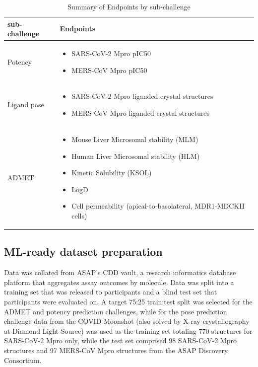 \documentclass[journal=jcim,manuscript=article]{achemso}
\begin{document}
\begin{table}[ht]
\centering
\caption{Summary of Endpoints by sub-challenge}
\begin{tabular}{|l|p{10cm}|}
\hline
\textbf{sub-challenge} & \textbf{Endpoints}  \\
\hline
Potency & 
\begin{itemize}
    \item SARS-CoV-2 Mpro pIC50
    \item MERS-CoV Mpro pIC50
\end{itemize} \\
\hline
Ligand pose  & 
\begin{itemize}
    \item SARS-CoV-2 Mpro liganded crystal structures
    \item MERS-CoV Mpro liganded crystal structures
\end{itemize} \\
\hline
ADMET & 
\begin{itemize}
  \item Mouse Liver Microsomal stability (MLM)
  \item Human Liver Microsomal stability (HLM)
  \item Kinetic Solubility (KSOL)
  \item LogD 
  \item Cell permeability (apical-to-basolateral, MDR1-MDCKII cells)
\end{itemize} \\
\hline
\end{tabular}
\end{table}

\subsection{ML-ready dataset preparation}

Data was collated from ASAP’s CDD vault, a research informatics database platform that aggregates assay outcomes by molecule. Data was split into a training set that was released to participants and a blind test set that participants were evaluated on. A target 75:25 train:test split was selected for the ADMET and potency prediction challenges, while for the pose prediction challenge data from the COVID Moonshot\cite{boby_2023} (also solved by X-ray crystallography at Diamond Light Source) was used as the training set totaling 770 structures for SARS-CoV-2 Mpro only, while the test set comprised 98 SARS-CoV-2 Mpro structures and 97 MERS-CoV Mpro structures from the ASAP Discovery Consortium.  
\end{document}
